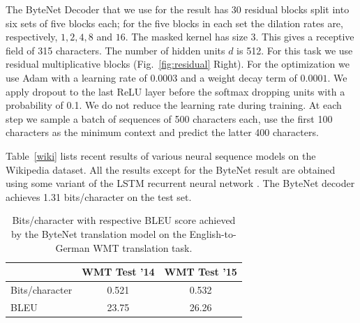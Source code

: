\documentclass{article}
\newcommand{\figref}[1]{Fig.~\ref{#1}}
\begin{document}
The ByteNet Decoder that we use for the result has 30 residual blocks split into six sets of five blocks each; for the five blocks in each set the dilation rates are, respectively, $1,2,4,8$ and $16$. The masked kernel has size 3. This gives a receptive field of 315 characters. The number of hidden units $d$ is 512.  For this task we use residual multiplicative blocks  (\figref{fig:residual} Right).
For the optimization we use Adam \citep{DBLP:journals/corr/KingmaB14} with a learning rate of $0.0003$ and a weight decay term of $0.0001$. We apply dropout to the last ReLU layer before the softmax dropping units with a probability of 0.1. We do not reduce the learning rate during training. At each step we sample a batch of sequences of 500 characters each, use the first 100 characters as the minimum context and predict the latter 400 characters.

Table~\ref{wiki} lists recent results of various neural sequence models on the Wikipedia dataset. All the results except for the ByteNet result are obtained using some variant of the LSTM recurrent neural network \citep{hochreiter1997long}. The ByteNet decoder achieves 1.31 bits/character on the test set.







\begin{table}[t]
\small
  \begin{center}
  \begin{tabular}{lcc}
    \toprule
      & \textbf{WMT Test '14} & \textbf{WMT Test '15} \\ \midrule
      Bits/character & 0.521 & 0.532  \\ \midrule
      BLEU & 23.75 & 26.26 \\
      \bottomrule
  \end{tabular}
  \end{center}
\caption{Bits/character with respective BLEU score achieved by the ByteNet translation model on the English-to-German WMT translation task.}
\label{nllresults}
\end{table}
\end{document}
